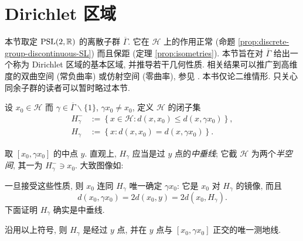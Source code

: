 \section{Dirichlet 区域}\label{sec:Dirichlet-domain}
本节取定 $\operatorname{PSL}(2,\mathbb{R})$ 的离散子群 $\overline{\Gamma}$. 它在 $\mathcal{H}$ 上的作用正常 (命题 \ref{prop:discrete-group-discontinuous-SL}) 而且保距 (定理 \ref{prop:isometries}). 本节旨在对 $\overline{\Gamma}$ 给出一个称为 Dirichlet 区域的基本区域, 并推导若干几何性质. 相关结果可以推广到高维度的双曲空间 (常负曲率) 或仿射空间 (零曲率), 参见 \cite{Bea95, Kat10}. 本书仅论二维情形. 只关心同余子群的读者可以暂时略过本节.

\begin{definition} 
	设 $x_0 \in \mathcal{H}$ 而 $\gamma \in \overline{\Gamma} \smallsetminus \{1\}$, $\gamma x_0 \neq x_0$, 定义 $\mathcal{H}$ 的闭子集
	\begin{align*}
		H_\gamma^- & := \left\{ x \in \mathcal{H}: d(x, x_0) \leq d(x, \gamma x_0) \right\}, \\
		H_\gamma & := \left\{x: d(x,x_0) = d(x, \gamma x_0) \right\}.
	\end{align*}
\end{definition}
取 $[x_0, \gamma x_0]$ 的中点 $y$. 直观上, $H_\gamma$ 应当是过 $y$ 点的\emph{中垂线}; 它截 $\mathcal{H}$ 为两个\emph{半空间}, 其一为 $H_\gamma^- \ni x_0$. 大致图像如:
\begin{center}\end{center}
一旦接受这些性质, 则 $x_0$ 连同 $H_\gamma$ 唯一确定 $\gamma x_0$: 它是 $x_0$ 对 $H_\gamma$ 的镜像, 而且
\begin{equation}\label{eqn:bisector-d}
	d(x_0, \gamma x_0) = 2d(x_0, y) = 2d(x_0, H_\gamma).
\end{equation}
下面证明 $H_\gamma$ 确实是中垂线.
\begin{lemma}\label{prop:bisector}
	沿用以上符号, 则 $H_\gamma$ 是经过 $y$ 点, 并在 $y$ 点与 $[x_0, \gamma x_0]$ 正交的唯一测地线.
\end{lemma}
